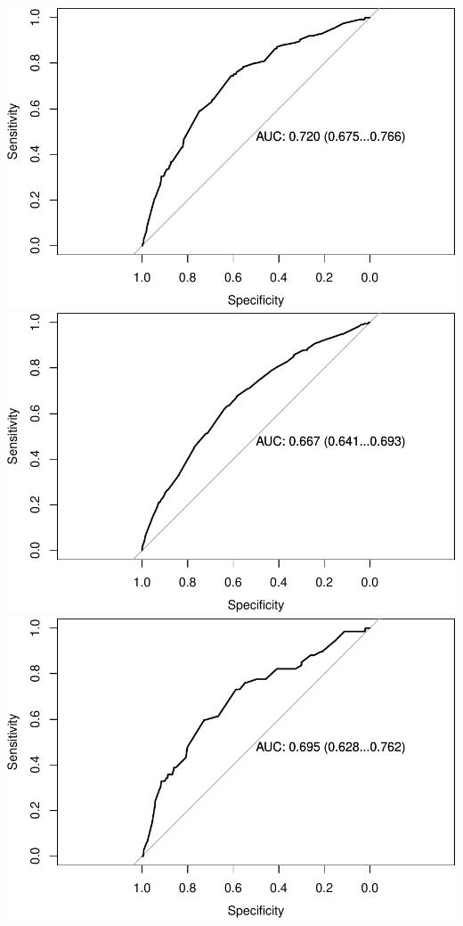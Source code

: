 \documentclass[11pt,]{article}
\begin{document}
\includegraphics{report2_files/figure-latex/plot-hac2011-females-1.pdf}
\includegraphics{report2_files/figure-latex/plot-hac2011-females-2.pdf}
\includegraphics{report2_files/figure-latex/plot-hac2011-females-3.pdf}
\end{document}

